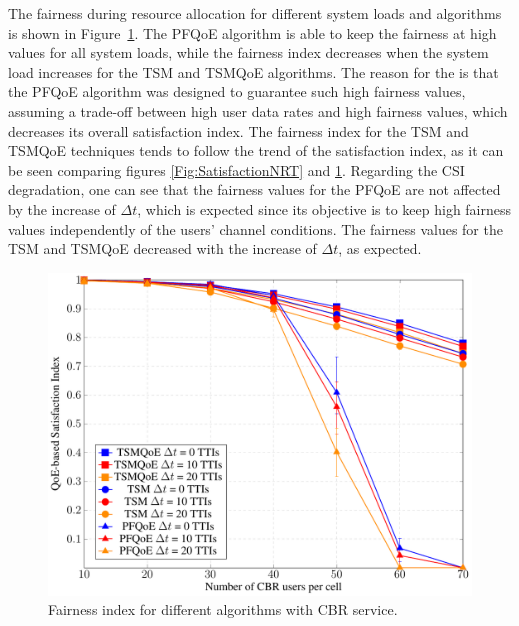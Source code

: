 \documentclass[conference]{IEEEtran}
\newcommand{\FigRef}[1]{Figure~\ref{#1}}
\begin{document}
The fairness during resource allocation for different system loads and algorithms is shown in \FigRef{Fig:FairnessNRT}. The PFQoE algorithm is able to keep the fairness at high values for all system loads, while the fairness index decreases when the system load increases for the TSM and TSMQoE algorithms. The reason for the is that the PFQoE algorithm was designed to guarantee such high fairness values, assuming a trade-off between high user data rates and high fairness values, which decreases its overall satisfaction index. The fairness index for the TSM and TSMQoE techniques tends to follow the trend of the satisfaction index, as it can be seen comparing figures \ref{Fig:SatisfactionNRT} and \ref{Fig:FairnessNRT}. Regarding the CSI degradation, one can see that the fairness values for the PFQoE are not affected by the increase of $\Delta t$, which is expected since its objective is to keep high fairness values independently of the users' channel conditions. The fairness values for the TSM and TSMQoE decreased with the increase of $\Delta t$, as expected.

\begin{figure}[!hb]
	\centering
	\includegraphics[width=0.55\linewidth,page=2]{figs_wp2/figs_BRUNO_PEDRO/NRT}
	\caption{Fairness index for different algorithms with CBR service.}
	\label{Fig:FairnessNRT}
\end{figure}

\end{document}

